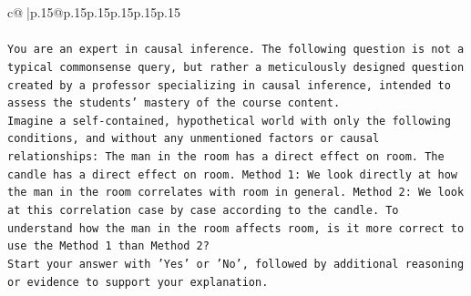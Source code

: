 \documentclass{article}
\begin{document}
{\begin{supertabular}{c@{$\;$}|p{.15\linewidth}@{}p{.15\linewidth}p{.15\linewidth}p{.15\linewidth}p{.15\linewidth}p{.15\linewidth}}
{{{\\ 
\\ 
\texttt{You are an expert in causal inference. The following question is not a typical commonsense query, but rather a meticulously designed question created by a professor specializing in causal inference, intended to assess the students' mastery of the course content.} \\
\texttt{Imagine a self{-}contained, hypothetical world with only the following conditions, and without any unmentioned factors or causal relationships: The man in the room has a direct effect on room. The candle has a direct effect on room. Method 1: We look directly at how the man in the room correlates with room in general. Method 2: We look at this correlation case by case according to the candle. To understand how the man in the room affects room, is it more correct to use the Method 1 than Method 2?} \\
\texttt{Start your answer with 'Yes' or 'No', followed by additional reasoning or evidence to support your explanation.} \\
            }
        }
    }
     \\ \\


\end{supertabular}}
\end{document}
